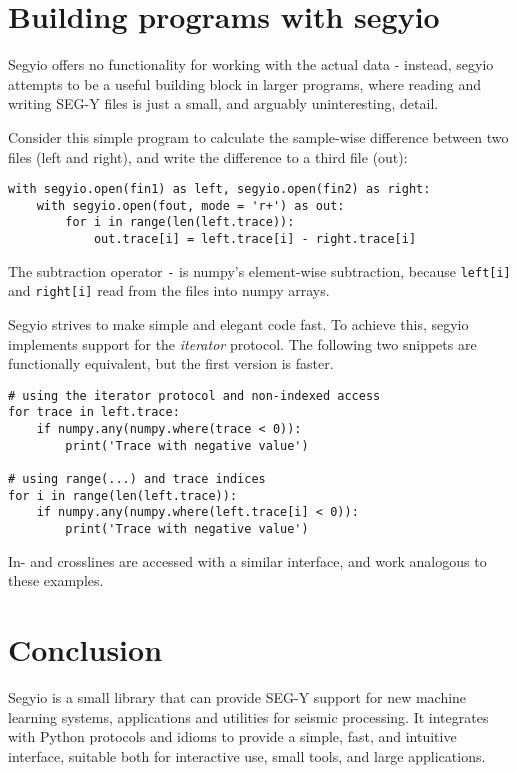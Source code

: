 \documentclass{article}
\begin{document}
\section{Building programs with segyio}

Segyio offers no functionality for working with the actual data - instead,
segyio attempts to be a useful building block in larger programs, where reading
and writing SEG-Y files is just a small, and arguably uninteresting, detail.

Consider this simple program to calculate the sample-wise difference between
two files (left and right), and write the difference to a third file (out):

\begin{minipage}{\linewidth}
\begin{lstlisting}
with segyio.open(fin1) as left, segyio.open(fin2) as right:
    with segyio.open(fout, mode = 'r+') as out:
        for i in range(len(left.trace)):
            out.trace[i] = left.trace[i] - right.trace[i]
\end{lstlisting}
\end{minipage}

The subtraction operator \verb|-| is numpy's element-wise subtraction, because
\verb|left[i]| and \verb|right[i]| read from the files into numpy arrays.

Segyio strives to make simple and elegant code fast. To achieve this, segyio
implements support for the \emph{iterator} \citep{pep-iterator} protocol. The
following two snippets are functionally equivalent, but the first version is
faster.

\begin{minipage}{\linewidth}
\begin{lstlisting}
# using the iterator protocol and non-indexed access
for trace in left.trace:
    if numpy.any(numpy.where(trace < 0)):
        print('Trace with negative value')

# using range(...) and trace indices
for i in range(len(left.trace)):
    if numpy.any(numpy.where(left.trace[i] < 0)):
        print('Trace with negative value')
\end{lstlisting}
\end{minipage}

In- and crosslines are accessed with a similar interface, and work analogous to
these examples.

\section{Conclusion}

Segyio is a small library that can provide SEG-Y support for new machine
learning systems, applications and utilities for seismic processing. It
integrates with Python protocols and idioms to provide a simple, fast, and
intuitive interface, suitable both for interactive use, small tools, and large
applications.


\end{document}
